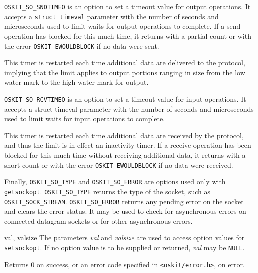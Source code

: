 \begin{apiparm}
	\texttt{OSKIT_SO_SNDTIMEO} is an option to set a timeout value for 
	output operations.
	It accepts a \texttt{struct timeval} parameter with the number 
	of seconds and microseconds used to limit waits for output operations 
	to complete.  If a send operation has blocked for this much time, 
	it returns with a partial count or with the error 
	\texttt{OSKIT_EWOULDBLOCK} if no data were sent.  

	This timer is restarted each time additional data 
	are delivered to the protocol, implying that the limit applies to 
	output portions ranging in size from the low water mark to the 
	high water mark for output.  

	\texttt{OSKIT_SO_RCVTIMEO} is an option to set a timeout value for 
	input operations.  It accepts a struct timeval parameter with the 
	number of seconds and microseconds used to limit waits for input 
	operations to complete.

	This timer is restarted each time additional data are received by 
	the protocol, and thus the limit is in effect
	an inactivity timer.  If a receive operation has been blocked for this
	much time without receiving additional data, it returns with a short
	count or with the error \texttt{OSKIT_EWOULDBLOCK} if no data were 
	received.

	Finally, \texttt{OSKIT_SO_TYPE} and \texttt{OSKIT_SO_ERROR} are options 
	used only with \texttt{getsockopt}.
	\texttt{OSKIT_SO_TYPE} returns the type of the socket, such as 
	\texttt{OSKIT_SOCK_STREAM}.  
	\texttt{OSKIT_SO_ERROR} returns any 
	pending error on the socket and clears the error status.  
	It may be used to check for asynchronous errors on connected datagram 
	sockets or for other asynchronous errors.
	
        \item[val, valsize]
	The parameters \emph{val} and \emph{valsize}
	are used to access option values for \texttt{setsockopt}.
	If no option value is to be supplied or returned, \emph{val} may be
	\texttt{NULL}.

\end{apiparm}

\begin{apiret}
        Returns 0 on success, or an error code specified in
        {\tt <oskit/error.h>}, on error.
\end{apiret}

%
%

